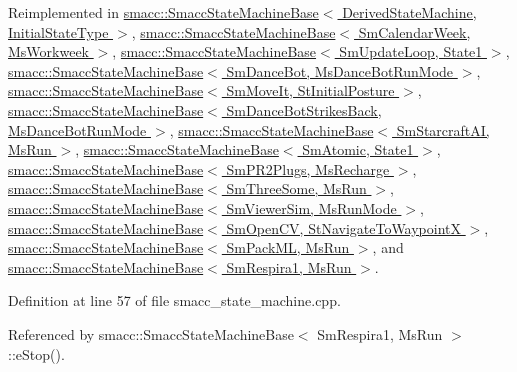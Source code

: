 Reimplemented in \hyperlink{structsmacc_1_1SmaccStateMachineBase_a3ba186af957cfe4ddbd7bdbe10630743}{smacc\+::\+Smacc\+State\+Machine\+Base$<$ Derived\+State\+Machine, Initial\+State\+Type $>$}, \hyperlink{structsmacc_1_1SmaccStateMachineBase_a3ba186af957cfe4ddbd7bdbe10630743}{smacc\+::\+Smacc\+State\+Machine\+Base$<$ Sm\+Calendar\+Week, Ms\+Workweek $>$}, \hyperlink{structsmacc_1_1SmaccStateMachineBase_a3ba186af957cfe4ddbd7bdbe10630743}{smacc\+::\+Smacc\+State\+Machine\+Base$<$ Sm\+Update\+Loop, State1 $>$}, \hyperlink{structsmacc_1_1SmaccStateMachineBase_a3ba186af957cfe4ddbd7bdbe10630743}{smacc\+::\+Smacc\+State\+Machine\+Base$<$ Sm\+Dance\+Bot, Ms\+Dance\+Bot\+Run\+Mode $>$}, \hyperlink{structsmacc_1_1SmaccStateMachineBase_a3ba186af957cfe4ddbd7bdbe10630743}{smacc\+::\+Smacc\+State\+Machine\+Base$<$ Sm\+Move\+It, St\+Initial\+Posture $>$}, \hyperlink{structsmacc_1_1SmaccStateMachineBase_a3ba186af957cfe4ddbd7bdbe10630743}{smacc\+::\+Smacc\+State\+Machine\+Base$<$ Sm\+Dance\+Bot\+Strikes\+Back, Ms\+Dance\+Bot\+Run\+Mode $>$}, \hyperlink{structsmacc_1_1SmaccStateMachineBase_a3ba186af957cfe4ddbd7bdbe10630743}{smacc\+::\+Smacc\+State\+Machine\+Base$<$ Sm\+Starcraft\+A\+I, Ms\+Run $>$}, \hyperlink{structsmacc_1_1SmaccStateMachineBase_a3ba186af957cfe4ddbd7bdbe10630743}{smacc\+::\+Smacc\+State\+Machine\+Base$<$ Sm\+Atomic, State1 $>$}, \hyperlink{structsmacc_1_1SmaccStateMachineBase_a3ba186af957cfe4ddbd7bdbe10630743}{smacc\+::\+Smacc\+State\+Machine\+Base$<$ Sm\+P\+R2\+Plugs, Ms\+Recharge $>$}, \hyperlink{structsmacc_1_1SmaccStateMachineBase_a3ba186af957cfe4ddbd7bdbe10630743}{smacc\+::\+Smacc\+State\+Machine\+Base$<$ Sm\+Three\+Some, Ms\+Run $>$}, \hyperlink{structsmacc_1_1SmaccStateMachineBase_a3ba186af957cfe4ddbd7bdbe10630743}{smacc\+::\+Smacc\+State\+Machine\+Base$<$ Sm\+Viewer\+Sim, Ms\+Run\+Mode $>$}, \hyperlink{structsmacc_1_1SmaccStateMachineBase_a3ba186af957cfe4ddbd7bdbe10630743}{smacc\+::\+Smacc\+State\+Machine\+Base$<$ Sm\+Open\+C\+V, St\+Navigate\+To\+Waypoint\+X $>$}, \hyperlink{structsmacc_1_1SmaccStateMachineBase_a3ba186af957cfe4ddbd7bdbe10630743}{smacc\+::\+Smacc\+State\+Machine\+Base$<$ Sm\+Pack\+M\+L, Ms\+Run $>$}, and \hyperlink{structsmacc_1_1SmaccStateMachineBase_a3ba186af957cfe4ddbd7bdbe10630743}{smacc\+::\+Smacc\+State\+Machine\+Base$<$ Sm\+Respira1, Ms\+Run $>$}.



Definition at line 57 of file smacc\+\_\+state\+\_\+machine.\+cpp.



Referenced by smacc\+::\+Smacc\+State\+Machine\+Base$<$ Sm\+Respira1, Ms\+Run $>$\+::e\+Stop().


